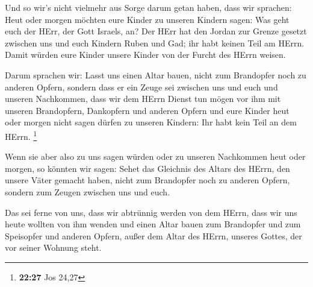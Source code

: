  Und so wir's nicht vielmehr aus Sorge darum getan haben,
dass wir sprachen: Heut oder morgen möchten eure Kinder zu unseren
Kindern sagen: Was geht euch der HErr, der Gott Israels, an?
 Der HErr hat den Jordan zur Grenze gesetzt zwischen uns
und euch Kindern Ruben und Gad; ihr habt keinen Teil am HErrn. Damit
würden eure Kinder unsere Kinder von der Furcht des HErrn weisen.

 Darum sprachen wir: Lasst uns einen Altar bauen, nicht zum
Brandopfer noch zu anderen Opfern,  sondern dass er ein
Zeuge sei zwischen uns und euch und unseren Nachkommen, dass wir dem
HErrn Dienst tun mögen vor ihm mit unseren Brandopfern, Dankopfern und
anderen Opfern und eure Kinder heut oder morgen nicht sagen dürfen zu
unseren Kindern: Ihr habt kein Teil an dem HErrn. \footnote{\textbf{22:27}
  Jos 24,27}

 Wenn sie aber also zu uns sagen würden oder zu unseren
Nachkommen heut oder morgen, so könnten wir sagen: Sehet das Gleichnis
des Altars des HErrn, den unsere Väter gemacht haben, nicht zum
Brandopfer noch zu anderen Opfern, sondern zum Zeugen zwischen uns und
euch.

 Das sei ferne von uns, dass wir abtrünnig werden von dem
HErrn, dass wir uns heute wollten von ihm wenden und einen Altar bauen
zum Brandopfer und zum Speisopfer und anderen Opfern, außer dem Altar
des HErrn, unseres Gottes, der vor seiner Wohnung steht.

